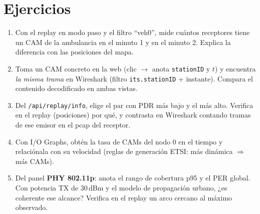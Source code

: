 \documentclass[11pt,a4paper]{article}
\begin{document}
\section{Ejercicios}

\begin{tareabox}
\begin{enumerate}[leftmargin=1.6em, itemsep=3pt]
  \item Con el replay en modo paso y el filtro ``veh0'', mide cuántos
        receptores tiene un CAM de la ambulancia en el minuto 1 y en el
        minuto 2. Explica la diferencia con las posiciones del mapa.
  \item Toma un CAM concreto en la web (clic $\rightarrow$ anota
        \texttt{stationID} y $t$) y encuentra \emph{la misma trama} en
        Wireshark (filtro \texttt{its.stationID} + instante). Compara el
        contenido decodificado en ambas vistas.
  \item Del \texttt{/api/replay/info}, elige el par con PDR más bajo y el más
        alto. Verifica en el replay (posiciones) por qué, y contrasta en
        Wireshark contando tramas de ese emisor en el pcap del receptor.
  \item Con I/O Graphs, obtén la tasa de CAMs del nodo 0 en el tiempo y
        relaciónala con su velocidad (reglas de generación ETSI: más dinámica
        $\Rightarrow$ más CAMs).
  \item Del panel \textbf{PHY 802.11p}: anota el rango de cobertura p95 y el
        PER global. Con potencia TX de 30\,dBm y el modelo de propagación
        urbano, ¿es coherente ese alcance? Verifica en el replay un arco
        cercano al máximo observado.
\end{enumerate}
\end{tareabox}
\end{document}
